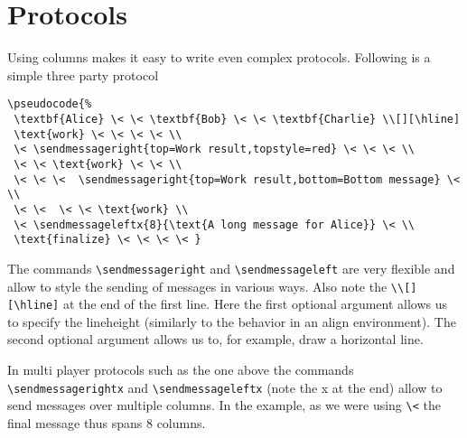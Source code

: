\documentclass[a4paper]{report}
\begin{document}
\section{Protocols}
Using columns makes it easy to write even complex protocols. Following is a simple
three party protocol
\begin{center}
\end{center}
\begin{lstlisting}
\pseudocode{%
 \textbf{Alice} \< \< \textbf{Bob} \< \< \textbf{Charlie} \\[][\hline]
 \text{work} \< \< \< \< \\
 \< \sendmessageright{top=Work result,topstyle=red} \< \< \< \\
 \< \< \text{work} \< \< \\
 \< \< \<  \sendmessageright{top=Work result,bottom=Bottom message} \< \\
 \< \<  \< \< \text{work} \\
 \< \sendmessageleftx{8}{\text{A long message for Alice}} \< \\
 \text{finalize} \< \< \< \< }
\end{lstlisting}
The commands \lstinline$\sendmessageright$ and \lstinline$\sendmessageleft$ are very flexible and
allow to style the sending of messages in various ways. Also note the \lstinline$\\[][\hline]$ at the end of the
first line. Here the first optional argument allows us to specify the lineheight (similarly to the behavior in an
align environment). The second optional argument allows us to, for example, draw a horizontal line.

In multi player protocols such as the one
above the commands  \lstinline$\sendmessagerightx$ and \lstinline$\sendmessageleftx$ (note the x at the end)
allow to send messages over multiple columns. In the example, as we were using \lstinline$\<$ the
final message thus spans 8 columns.
\end{document}
